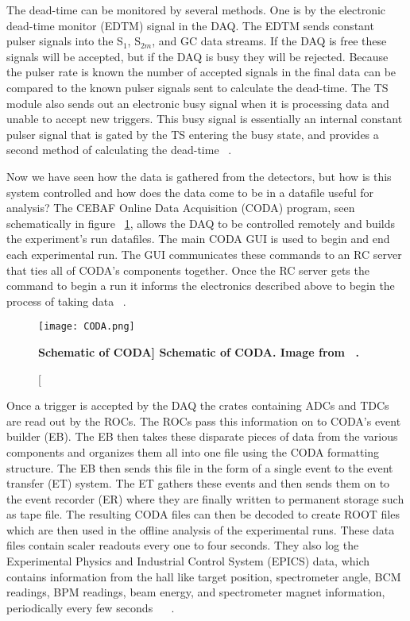 The dead-time can be monitored by several methods. One is by the electronic dead-time monitor (EDTM) signal in the DAQ. The EDTM sends constant pulser signals into the S$_1$, S$_{2m}$, and GC data streams. If the DAQ is free these signals will be accepted, but if the DAQ is busy they will be rejected. Because the pulser rate is known the number of accepted signals in the final data can be compared to the known pulser signals sent to calculate the dead-time. The TS module also sends out an electronic busy signal when it is processing data and unable to accept new triggers. This busy signal is essentially an internal constant pulser signal that is gated by the TS entering the busy state, and provides a second method of calculating the dead-time ~\cite{DAQ}. 

Now we have seen how the data is gathered from the detectors, but how is this system controlled and how does the data come to be in a datafile useful for analysis? The CEBAF Online Data Acquisition (CODA) program, seen schematically in figure ~\ref{fig:coda}, allows the DAQ to be controlled remotely and builds the experiment's run datafiles. The main CODA GUI is used to begin and end each experimental run. The GUI communicates these commands to an RC server that ties all of CODA's components together. Once the RC server gets the command to begin a run it informs the electronics described above to begin the process of taking data ~\cite{DAQ}. 

\begin{figure}[!ht]
\begin{center}
\texttt{[image: CODA.png]}
\end{center}
\caption[\bf{Schematic of CODA}]{
{\bf{Schematic of CODA.}} Image from ~\cite{DAQ}.}
\label{fig:coda}
\end{figure}

Once a trigger is accepted by the DAQ the crates containing ADCs and TDCs are read out by the ROCs. The ROCs pass this information on to CODA's event builder (EB). The EB then takes these disparate pieces of data from the various components and organizes them all into one file using the CODA formatting structure. The EB then sends this file in the form of a single event to the event transfer (ET) system. The ET gathers these events and then sends them on to the event recorder (ER) where they are finally written to permanent storage such as tape file. The resulting CODA files can then be decoded to create ROOT files which are then used in the offline analysis of the experimental runs. These data files contain scaler readouts every one to four seconds. They also log the Experimental Physics and Industrial Control System (EPICS) data, which contains information from the hall like target position, spectrometer angle, BCM readings, BPM readings, beam energy, and spectrometer magnet information, periodically every few seconds ~\cite{DAQ} ~\cite{Thesis:Ye}. 

